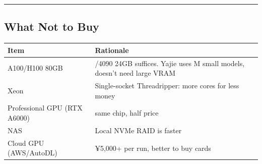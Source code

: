 \documentclass[
  12pt,
]{article}
\begin{document}
\begin{center}\rule{0.5\linewidth}{0.5pt}\end{center}

\subsection{What Not to Buy}\label{what-not-to-buy}

\begin{longtable}[]{@{}%
  >{\raggedright\arraybackslash}p{}%
  >{\raggedright\arraybackslash}p{}@{}}
\toprule\noalign{}
\begin{minipage}[b]{\linewidth}\raggedright
Item
\end{minipage} & \begin{minipage}[b]{\linewidth}\raggedright
Rationale
\end{minipage} \\
\midrule\noalign{}
\endhead
\bottomrule\noalign{}
\endlastfoot
A100/H100 80GB & 3090/4090 24GB suffices. Yajie uses M small models, doesn't need large VRAM \\
Xeon & Single-socket Threadripper: more cores for less money \\
Professional GPU (RTX A6000) & 4090 same chip, half price \\
NAS & Local NVMe RAID is faster \\
Cloud GPU (AWS/AutoDL) & ¥5,000+ per run, better to buy cards \\
\end{longtable}
\end{document}
